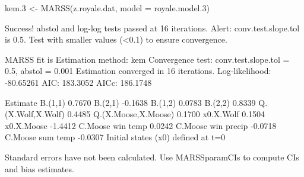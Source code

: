 \begin{Schunk}
\begin{Sinput}
 kem.3 <- MARSS(z.royale.dat, model = royale.model.3)
\end{Sinput}
\begin{Soutput}
Success! abstol and log-log tests passed at 16 iterations.
Alert: conv.test.slope.tol is 0.5.
Test with smaller values (<0.1) to ensure convergence.

MARSS fit is
Estimation method: kem 
Convergence test: conv.test.slope.tol = 0.5, abstol = 0.001
Estimation converged in 16 iterations. 
Log-likelihood: -80.65261 
AIC: 183.3052   AICc: 186.1748   
 
                    Estimate
B.(1,1)               0.7670
B.(2,1)              -0.1638
B.(1,2)               0.0783
B.(2,2)               0.8339
Q.(X.Wolf,X.Wolf)     0.4485
Q.(X.Moose,X.Moose)   0.1700
x0.X.Wolf             0.1504
x0.X.Moose           -1.4412
C.Moose win temp      0.0242
C.Moose win precip   -0.0718
C.Moose sum temp     -0.0307
Initial states (x0) defined at t=0

Standard errors have not been calculated. 
Use MARSSparamCIs to compute CIs and bias estimates.
\end{Soutput}
\end{Schunk}
